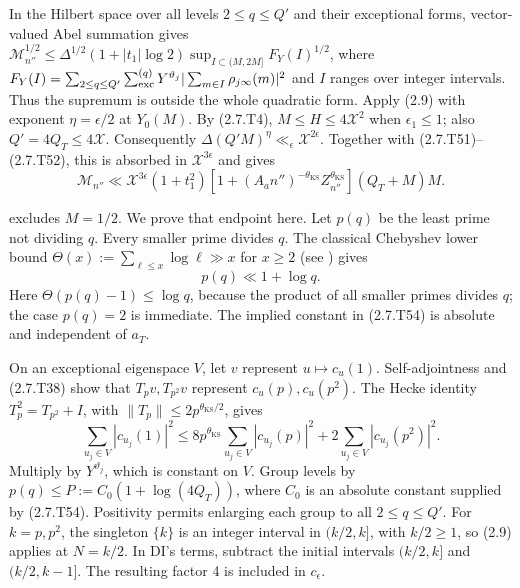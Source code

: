 In the Hilbert space over all levels $2\le q\le Q'$ and their exceptional
forms, vector-valued Abel summation gives
$\mathcal M_{n''}^{1/2}\le\Delta^{1/2}
(1+|t_1|\log2)\sup_{I\subset(M,2M]}
F_Y(I)^{1/2}$, where
$F_Y(I)=\sum_{2\le q\le Q'}\sum_{\rm exc}^{(q)}Y^{\vartheta_j}
|\sum_{m\in I}\rho_{j\infty}(m)|^2$ and $I$ ranges over integer
intervals. Thus the supremum is outside the whole quadratic form.
Apply (2.9) with exponent $\eta=\epsilon/2$ at $Y_0(M)$.
By (2.7.T4), $M\le H\le4\mathcal X^2$ when $\epsilon_1\le1$;
also $Q'=4Q_T\le4\mathcal X$. Consequently
$\Delta(Q'M)^\eta\ll_\epsilon\mathcal X^{2\epsilon}$.
Together with (2.7.T51)--(2.7.T52), this is absorbed in
$\mathcal X^{3\epsilon}$ and gives
\[
\mathcal M_{n''}\ll\mathcal X^{3\epsilon}(1+t_1^2)
 [1+(A_an'')^{-\theta_{\mathrm{KS}}}Z_{n''}^{\theta_{\mathrm{KS}}}](Q_T+M)M.
\tag{2.7.T53}\label{p1:eq:2.7.T53}
\]

\cite[(8.17)]{DI82} excludes $M=1/2$. We prove that endpoint here.
Let $p(q)$ be the least prime not dividing $q$. Every smaller
prime divides $q$. The classical Chebyshev lower bound
$\Theta(x):=\sum_{\ell\le x}\log\ell\gg x$ for $x\ge2$
(see \cite{IK04}) gives
\[
p(q)\ll1+\log q.
\tag{2.7.T54}\label{p1:eq:2.7.T54}
\]
Here $\Theta(p(q)-1)\le\log q$, because the product of all
smaller primes divides $q$; the case $p(q)=2$ is immediate.
The implied constant in (2.7.T54) is absolute and independent of $a_T$.

On an exceptional eigenspace $V$, let $v$ represent
$u\mapsto c_u(1)$. Self-adjointness and (2.7.T38) show that
$T_pv,T_{p^2}v$ represent $c_u(p),c_u(p^2)$.
The Hecke identity $T_p^2=T_{p^2}+I$, with
$\|T_p\|\le2p^{\theta_{\mathrm{KS}}/2}$, gives
\[
\sum_{u_j\in V}|c_{u_j}(1)|^2
 \le8p^{\theta_{\mathrm{KS}}}\sum_{u_j\in V}|c_{u_j}(p)|^2
       +2\sum_{u_j\in V}|c_{u_j}(p^2)|^2.
\tag{2.7.T55}\label{p1:eq:2.7.T55}
\]
Multiply by $Y^{\vartheta_j}$, which is constant on $V$. Group
levels by $p(q)\le P:=C_0(1+\log(4Q_T))$, where $C_0$ is an
absolute constant supplied by (2.7.T54). Positivity permits
enlarging each group to all $2\le q\le Q'$. For $k=p,p^2$, the singleton $\{k\}$ is an integer interval in $(k/2,k]$, with $k/2\ge1$, so (2.9) applies at $N=k/2$. In DI's terms, subtract the initial intervals $(k/2,k]$ and $(k/2,k-1]$. The resulting factor 4 is included in $c_\epsilon$.

